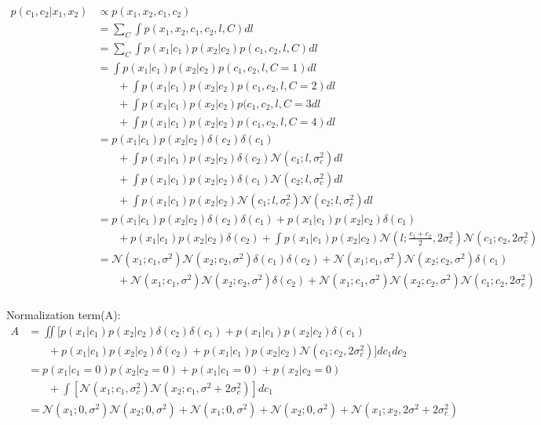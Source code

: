 \documentclass[12pt]{article}
\begin{document}
\begin{equation}
\begin{aligned}
p(c_1, c_2|x_1, x_2) &\propto p(x_1, x_2, c_1, c_2) \\ 
& =  \sum\limits_{C} \int p(x_1, x_2, c_1, c_2, l, C) dl\\
& = \sum\limits_{C} \int p(x_1|c_1)p(x_2|c_2) p(c_1, c_2, l, C) dl \\
& = \int p(x_1|c_1)p(x_2|c_2) p(c_1, c_2, l, C=1) dl \\
&\phantom{{}=1}+ \int p(x_1|c_1)p(x_2|c_2) p(c_1, c_2, l, C=2) dl\\
&\phantom{{}=1}+ \int p(x_1|c_1)p(x_2|c_2) p(c_1, c_2, l, C=3 dl\\
&\phantom{{}=1}+ \int p(x_1|c_1)p(x_2|c_2) p(c_1, c_2, l, C=4) dl\\
& = p(x_1|c_1)p(x_2|c_2) \delta(c_2)\delta(c_1) \\
&\phantom{{}=1} + \int p(x_1|c_1)p(x_2|c_2) \delta(c_2) \mathcal{N}(c_1; l, \sigma_c^2)dl \\
&\phantom{{}=1} + \int p(x_1|c_1)p(x_2|c_2) \delta(c_1) \mathcal{N}(c_2; l, \sigma_c^2)dl \\
&\phantom{{}=1} + \int p(x_1|c_1)p(x_2|c_2) \mathcal{N}(c_1; l, \sigma_c^2) \mathcal{N}(c_2; l, \sigma_c^2)dl \\
& = p(x_1|c_1)p(x_2|c_2) \delta(c_2)\delta(c_1) + p(x_1|c_1)p(x_2|c_2) \delta(c_1)\\
& \phantom{{}=1} + p(x_1|c_1)p(x_2|c_2) \delta(c_2) +  \int p(x_1|c_1)p(x_2|c_2)\mathcal{N}(l; \frac{c_1 + c_2}{2}, 2\sigma_c^2)\mathcal{N}(c_1; c_2, 2\sigma_c^2) \\
& = \mathcal{N}(x_1; c_1, \sigma^2)\mathcal{N}(x_2; c_2, \sigma^2)\delta(c_1)\delta(c_2) + \mathcal{N}(x_1; c_1, \sigma^2)\mathcal{N}(x_2; c_2, \sigma^2)\delta(c_1) \\
& \phantom{{}=1} + \mathcal{N}(x_1; c_1, \sigma^2)\mathcal{N}(x_2; c_2, \sigma^2)\delta(c_2)  + \mathcal{N}(x_1; c_1, \sigma^2)\mathcal{N}(x_2; c_2, \sigma^2)\mathcal{N}(c_1; c_2, 2\sigma_c^2) \\
\end{aligned}
\end{equation}

Normalization term(A):
\begin{equation}
\begin{aligned}
A & = \iint [p(x_1|c_1)p(x_2|c_2) \delta(c_2)\delta(c_1) + p(x_1|c_1)p(x_2|c_2) \delta(c_1) \\
& \phantom{{}=1} + p(x_1|c_1)p(x_2|c_2) \delta(c_2) +  p(x_1|c_1)p(x_2|c_2)\mathcal{N}(c_1; c_2, 2\sigma_c^2)]dc_1dc_2 \\
& = p(x_1|c_1=0)p(x_2|c_2=0) + p(x_1|c_1=0) + p(x_2|c_2=0) \\
& \phantom{{}=1} + \int[\mathcal{N}(x_1; c_1, \sigma_c^2) \mathcal{N}(x_2; c_1, \sigma^2 + 2\sigma_c^2)]dc_1\\
& = \mathcal{N}(x_1; 0, \sigma^2)\mathcal{N}(x_2; 0, \sigma^2) + \mathcal{N}(x_1; 0, \sigma^2) +\mathcal{N}(x_2; 0, \sigma^2) + \mathcal{N}(x_1; x_2, 2\sigma^2 + 2\sigma_c^2)
\end{aligned}
\end{equation}
\end{document}
